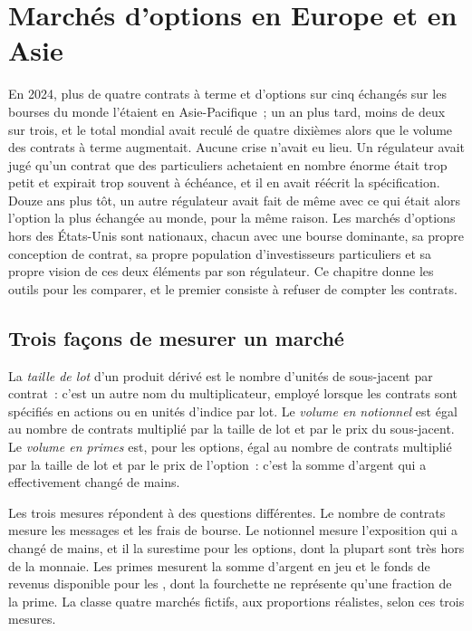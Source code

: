\chapter{Marchés d'options en Europe et en Asie}\label{ch:m1:options-markets-europe-asia}

En 2024, plus de quatre contrats à terme et d'options sur cinq échangés sur
les bourses du monde l'étaient en Asie-Pacifique~; un an plus tard, moins
de deux sur trois, et le total mondial avait reculé de quatre dixièmes alors que
le volume des contrats à terme augmentait. Aucune crise n'avait eu lieu. Un régulateur avait jugé qu'un contrat
que des particuliers achetaient en nombre énorme était trop petit et expirait
trop souvent à échéance, et il en avait réécrit la spécification. Douze ans plus tôt, un autre
régulateur avait fait de même avec ce qui était alors l'option la plus échangée
au monde, pour la même raison. Les marchés d'options hors des
États-Unis sont nationaux, chacun avec une bourse dominante, sa propre
conception de contrat, sa propre population d'investisseurs particuliers et sa
propre vision de ces deux éléments par son régulateur. Ce chapitre donne les outils pour les comparer, et le premier
consiste à refuser de compter les contrats.

\section{Trois façons de mesurer un marché}

\begin{definition}\label{def:m1:options-markets-europe-asia:turnover}
La \emph{taille de lot} d'un produit dérivé est le
nombre d'unités de sous-jacent par contrat~: c'est un autre nom du multiplicateur,
employé lorsque les contrats sont spécifiés en actions ou en unités d'indice par lot.
Le \emph{volume en notionnel} est égal au
nombre de contrats multiplié par la taille de lot et par le prix du sous-jacent. Le \emph{volume en primes}
est, pour les options, égal au nombre de contrats multiplié par la taille de lot et
par le prix de l'option~: c'est la somme d'argent qui a effectivement changé de mains.
\end{definition}

Les trois mesures répondent à des questions différentes. Le nombre de contrats mesure les messages
et les frais de bourse. Le notionnel mesure l'exposition qui a changé de mains, et
il la surestime pour les options, dont la plupart sont très hors de la monnaie. Les primes
mesurent la somme d'argent en jeu et le fonds de revenus disponible pour les ,
dont la fourchette ne représente qu'une fraction de la prime.
La  classe quatre marchés fictifs,
aux proportions réalistes, selon ces trois mesures.

